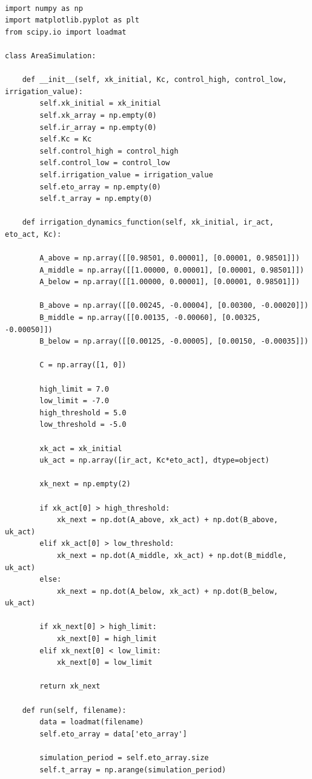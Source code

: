 \documentclass[12pt]{article}
\begin{document}
\begin{lstlisting}

import numpy as np
import matplotlib.pyplot as plt
from scipy.io import loadmat

class AreaSimulation:

    def __init__(self, xk_initial, Kc, control_high, control_low, irrigation_value):
        self.xk_initial = xk_initial
        self.xk_array = np.empty(0)
        self.ir_array = np.empty(0)
        self.Kc = Kc
        self.control_high = control_high
        self.control_low = control_low
        self.irrigation_value = irrigation_value
        self.eto_array = np.empty(0)
        self.t_array = np.empty(0)

    def irrigation_dynamics_function(self, xk_initial, ir_act, eto_act, Kc):

        A_above = np.array([[0.98501, 0.00001], [0.00001, 0.98501]])
        A_middle = np.array([[1.00000, 0.00001], [0.00001, 0.98501]])
        A_below = np.array([[1.00000, 0.00001], [0.00001, 0.98501]])

        B_above = np.array([[0.00245, -0.00004], [0.00300, -0.00020]])
        B_middle = np.array([[0.00135, -0.00060], [0.00325, -0.00050]])
        B_below = np.array([[0.00125, -0.00005], [0.00150, -0.00035]])

        C = np.array([1, 0])

        high_limit = 7.0
        low_limit = -7.0
        high_threshold = 5.0
        low_threshold = -5.0

        xk_act = xk_initial
        uk_act = np.array([ir_act, Kc*eto_act], dtype=object)

        xk_next = np.empty(2)

        if xk_act[0] > high_threshold:
            xk_next = np.dot(A_above, xk_act) + np.dot(B_above, uk_act)
        elif xk_act[0] > low_threshold:
            xk_next = np.dot(A_middle, xk_act) + np.dot(B_middle, uk_act)
        else:
            xk_next = np.dot(A_below, xk_act) + np.dot(B_below, uk_act)
            
        if xk_next[0] > high_limit:
            xk_next[0] = high_limit
        elif xk_next[0] < low_limit:
            xk_next[0] = low_limit

        return xk_next
    
    def run(self, filename):
        data = loadmat(filename)
        self.eto_array = data['eto_array']
        
        simulation_period = self.eto_array.size
        self.t_array = np.arange(simulation_period)
        

\end{lstlisting}
\end{document}
